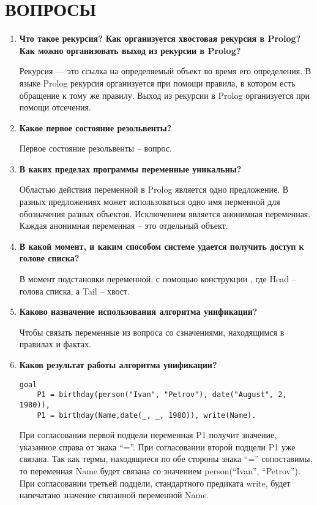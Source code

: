 \section{ВОПРОСЫ}

\begin{enumerate}
    \item \textbf{Что такое рекурсия? Как организуется хвостовая рекурсия в Prolog? Как можно организовать выход из рекурсии в Prolog?}

        Рекурсия — это ссылка на определяемый объект во время его определения. В языке Prolog рекурсия организуется при помощи правила, в котором есть обращение к тому же правилу. Выход из рекурсии в Prolog организуется при помощи отсечения.

    \item \textbf{Какое первое состояние резольвенты?}

        Первое состояние резольвенты -- вопрос.

    \item \textbf{В каких пределах программы переменные уникальны?}

        Областью действия переменной в Prolog является одно предложение. В разных предложениях может использоваться одно имя перменной для обозначения разных объектов. Исключением является анонимная переменная. Каждая анонимная переменная -- это отдельный объект.

    \item \textbf{В какой момент, и каким способом системе удается получить доступ к голове списка?}

        В момент подстановки переменной, с помощью конструкции {}, где {\ttfamily Head} -- голова списка, а {\ttfamily Tail} -- хвост.

    \item \textbf{Каково назначение использования алгоритма унификации?}

        Чтобы связать переменные из вопроса со сзначениями, находящимся в правилах и фактах.

    \item \textbf{Каков  результат работы алгоритма унификации?}

\begin{lstlisting}
goal
    P1 = birthday(person("Ivan", "Petrov"), date("August", 2, 1980)),
    P1 = birthday(Name,date(_, _, 1980)), write(Name).
\end{lstlisting}

        При согласовании первой подцели переменная P1 получит значение, указанное справа от знака ``=''. При согласовании второй подцели P1 уже связана. Так как термы, находящиеся по обе стороны знака ``='' сопоставимы, то переменная Name будет связана со значением person(``Ivan'', ``Petrov''). При согласовании третьей подцели, стандартного предиката write, будет напечатано значение связанной переменной Name.


\end{enumerate}
